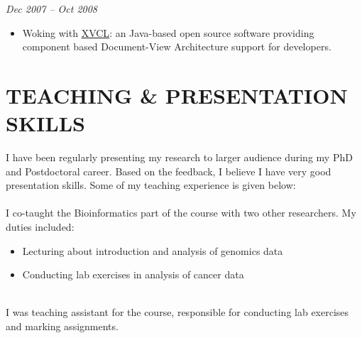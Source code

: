 \documentclass[margin, 10pt]{res} %
\begin{document}
\begin{resume}

 
{\sl \textbf{}} \hfill \textit{Dec 2007 -- Oct 2008} \\
{\color{RubineRed}{Computer Science Department, LUMS, Pakistan}} 
\begin{itemize} 
\item Woking with \href{http://www.sciencedirect.com/science/article/pii/S0167642304000978}{XVCL}: an Java-based open source software providing component based Document-View Architecture support for developers. 
\end{itemize} 



\section{TEACHING \& PRESENTATION SKILLS}
I have been regularly presenting my research to larger audience during my PhD and Postdoctoral career. Based on the feedback, I believe I have very good presentation skills. Some of my teaching experience is given below: \\

{\bf \color{Brown}{Molecular Oncology and Biostatistics, 2017}} \\
I co-taught the Bioinformatics part of the course with two other researchers. My duties included: 
\begin{itemize} 
\item Lecturing about introduction and analysis of genomics data 
\item Conducting lab exercises in analysis of cancer data
\end{itemize} 
{\bf \color{Brown}{Advanced Software Engineering, 2008}} \\
I was teaching assistant for the course, responsible for conducting lab exercises and marking assignments.


\end{resume}
\end{document}
